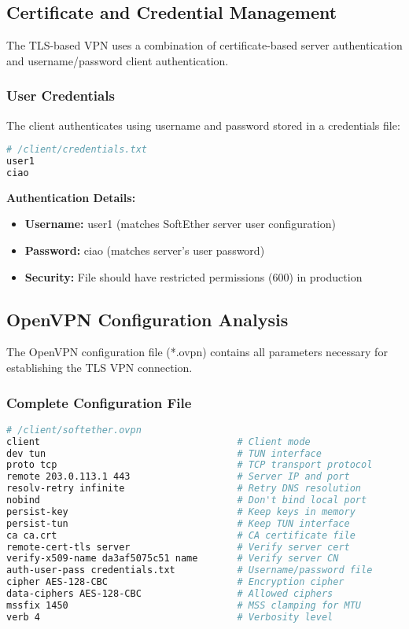 \subsection{Certificate and Credential Management}

The TLS-based VPN uses a combination of certificate-based server authentication and username/password client authentication.

\subsubsection{User Credentials}

The client authenticates using username and password stored in a credentials file:

\begin{lstlisting}[language=bash]
# /client/credentials.txt
user1
ciao
\end{lstlisting}

\noindent
\textbf{Authentication Details:}
\begin{itemize}
    \item \textbf{Username:} user1 (matches SoftEther server user configuration)
    \item \textbf{Password:} ciao (matches server's user password)
    \item \textbf{Security:} File should have restricted permissions (600) in production
\end{itemize}

\subsection{OpenVPN Configuration Analysis}

The OpenVPN configuration file (*.ovpn) contains all parameters necessary for establishing the TLS VPN connection.

\subsubsection{Complete Configuration File}

\begin{lstlisting}[language=bash]
# /client/softether.ovpn
client                                   # Client mode
dev tun                                  # TUN interface
proto tcp                                # TCP transport protocol
remote 203.0.113.1 443                   # Server IP and port
resolv-retry infinite                    # Retry DNS resolution
nobind                                   # Don't bind local port
persist-key                              # Keep keys in memory
persist-tun                              # Keep TUN interface
ca ca.crt                                # CA certificate file
remote-cert-tls server                   # Verify server cert
verify-x509-name da3af5075c51 name       # Verify server CN
auth-user-pass credentials.txt           # Username/password file
cipher AES-128-CBC                       # Encryption cipher
data-ciphers AES-128-CBC                 # Allowed ciphers
mssfix 1450                              # MSS clamping for MTU
verb 4                                   # Verbosity level
\end{lstlisting}

